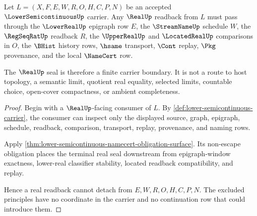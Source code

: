 \begin{theorem}
\label{thm:lowersemicontinuous-real-seal-nonescape}
Let $L=(X,F,E,W,R,O,H,C,P,N)$ be an accepted
$\LowerSemicontinuousUp$ carrier. Any $\RealUp$ readback from $L$ must pass
through the $\LowerRealUp$ epigraph row $E$, the $\StreamNameUp$ schedule
$W$, the $\RegSeqRatUp$ readback $R$, the $\UpperRealUp$ and
$\LocatedRealUp$ comparisons in $O$, the $\BHist$ history rows, $\hsame$
transport, $\Cont$ replay, $\Pkg$ provenance, and the local $\NameCert$ row.

The $\RealUp$ seal is therefore a finite carrier boundary. It is not a route
to host topology, a semantic limit, quotient real equality, selected limits,
countable choice, open-cover compactness, or ambient completeness.
\end{theorem}
\begin{proof}
Begin with a $\RealUp$-facing consumer of $L$. By
\autoref{def:lower-semicontinuous-carrier}, the consumer can inspect only the
displayed source, graph, epigraph, schedule, readback, comparison, transport,
replay, provenance, and naming rows.

Apply \autoref{thm:lower-semicontinuous-namecert-obligation-surface}. Its
non-escape obligation places the terminal real seal downstream from
epigraph-window exactness, lower-real classifier stability, located readback
compatibility, and replay.

Hence a real readback cannot detach from $E,W,R,O,H,C,P,N$. The excluded
principles have no coordinate in the carrier and no continuation row that
could introduce them.
\end{proof}

